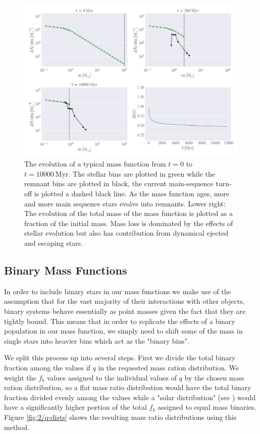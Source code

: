 \begin{figure}
	\centering
	\includegraphics[width=\textwidth]{figures/evolve_mf.png}
	\caption{The evolution of a typical mass function from $t=0$ to $t=10000 \ \mathrm{Myr}$.
		The stellar bins are plotted in green while the remnant bins are plotted in black,
		the current main-sequence turn-off is plotted a dashed black line. As the mass
		function ages, more and more main sequence stars evolve into remnants. Lower right:
		The evolution of the total mass of the mass function is plotted as a fraction of the
		initial mass. Mass loss is dominated by the effects of stellar evolution but also
		has contribution from dynamical ejected and escaping stars.}
	\label{fig:2/evolve_mf}
\end{figure}


\subsection{Binary Mass Functions}

In order to include binary stars in our mass functions we make use of the assumption that for the
vast majority of their interactions with other objects, binary systems behave essentially as point
masses given the fact that they are tightly bound. This means that in order to replicate the effects
of a binary population in our mass function, we simply need to shift some of the mass in single
stars into heavier bins which act as the "binary bins".


We split this process up into several steps. First we divide the total binary fraction among the
values if $q$ in the requested mass ration distribution. We weight the $f_b$ values assigned to the
individual values of $q$ by the chosen mass ration distribution, so a flat mass ratio distribution
would have the total binary fraction divided evenly among the values while a "solar distribution"
(see \citealt{Fisher2005}) would have a significantly higher portion of the total $f_b$ assigned to
equal mass binaries. Figure \ref{fig:2/q-dists} shows the resulting mass ratio distributions using
this method.

